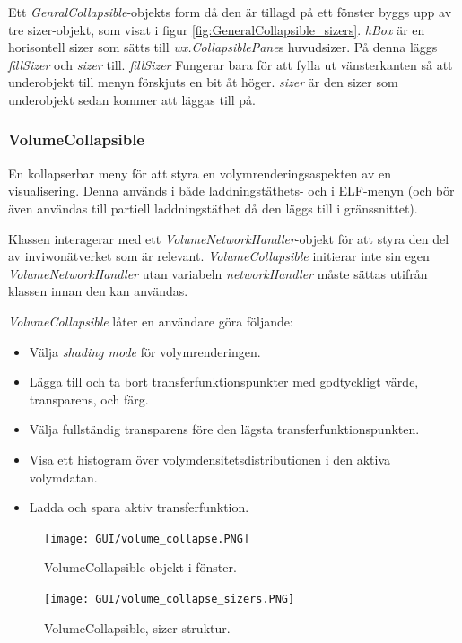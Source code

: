 Ett \textit{GenralCollapsible}-objekts form då den är tillagd på ett fönster byggs upp av tre sizer-objekt, som visat i figur \ref{fig:GeneralCollapsible_sizers}. \textit{hBox} är en horisontell sizer som sätts till \textit{wx.CollapsiblePane}s huvudsizer. På denna läggs \textit{fillSizer} och \textit{sizer} till. \textit{fillSizer} Fungerar bara för att fylla ut vänsterkanten så att underobjekt till menyn förskjuts en bit åt höger. \textit{sizer} är den sizer som underobjekt sedan kommer att läggas till på. 

\subsubsection{VolumeCollapsible}
En kollapserbar meny för att styra en volymrenderingsaspekten av en visualisering. Denna används i både laddningstäthets- och i ELF-menyn (och bör även användas till partiell laddningstäthet då den läggs till i gränssnittet).

Klassen interagerar med ett \textit{VolumeNetworkHandler}-objekt för att styra den del av inviwonätverket som är relevant. \textit{VolumeCollapsible} initierar inte sin egen \textit{VolumeNetworkHandler} utan variabeln \textit{networkHandler} måste sättas utifrån klassen innan den kan användas.

\newpage

\textit{VolumeCollapsible} låter en användare göra följande:
\begin{itemize}
    \setlength\itemsep{0em}
    \item Välja \textit{shading mode} för volymrenderingen.
    \item Lägga till och ta bort transferfunktionspunkter med godtyckligt värde, transparens, och färg.
    \item Välja fullständig transparens före den lägsta transferfunktionspunkten.
    \item Visa ett histogram över volymdensitetsdistributionen i den aktiva volymdatan.
    \item Ladda och spara aktiv transferfunktion.
\end{itemize}

\begin{figure}[H]
  \centering
  \begin{minipage}[b]{0.4\textwidth}
    \texttt{[image: GUI/volume\_collapse.PNG]}
    \caption{VolumeCollapsible-objekt i fönster.}
  \end{minipage}
  \hfill
  \begin{minipage}[b]{0.4\textwidth}
    \texttt{[image: GUI/volume\_collapse\_sizers.PNG]}
    \caption{VolumeCollapsible, sizer-struktur.}
  \end{minipage}
\end{figure}

